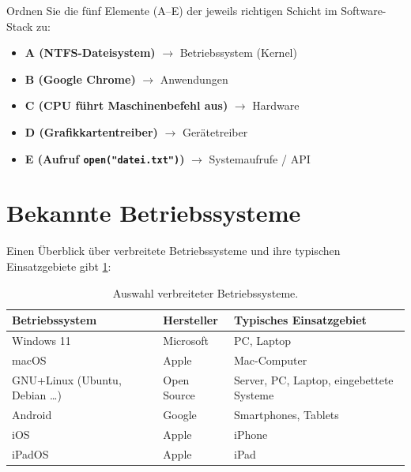 \begin{myexercise}\label{myexercise:software-stack-zuordnung}
    Ordnen Sie die fünf Elemente (A--E) der jeweils richtigen Schicht im Software-Stack zu:
    \begin{center}
        
    \end{center}
    \begin{myanswer}
        \begin{center}
            
        \end{center}
        \begin{itemize}
            \item \textbf{A (NTFS-Dateisystem)} $\to$ Betriebssystem (Kernel)
            \item \textbf{B (Google Chrome)} $\to$ Anwendungen
            \item \textbf{C (\gls{CPU} führt Maschinenbefehl aus)} $\to$ Hardware
            \item \textbf{D (Grafikkartentreiber)} $\to$ Gerätetreiber
            \item \textbf{E (Aufruf \texttt{open("datei.txt")})} $\to$ Systemaufrufe / API
        \end{itemize}
    \end{myanswer}
\end{myexercise}

\section{Bekannte Betriebssysteme}

Einen Überblick über verbreitete Betriebssysteme und ihre typischen Einsatzgebiete gibt \cref{tab:betriebssysteme}:

\begin{table}[H]
    \centering
    \begin{tabular}{lll}
        \textbf{Betriebssystem} & \textbf{Hersteller} & \textbf{Typisches Einsatzgebiet} \\\midrule
        Windows 11              & Microsoft           & PC, Laptop \\
        macOS                   & Apple               & Mac-Computer \\
        GNU+Linux (Ubuntu, Debian \ldots) & Open Source  & Server, PC, Laptop, eingebettete Systeme \\
        Android                 & Google              & Smartphones, Tablets \\
        iOS                     & Apple               & iPhone \\
        iPadOS                  & Apple               & iPad \\
    \end{tabular}
    \caption{Auswahl verbreiteter Betriebssysteme.}
    \label{tab:betriebssysteme}
\end{table}

